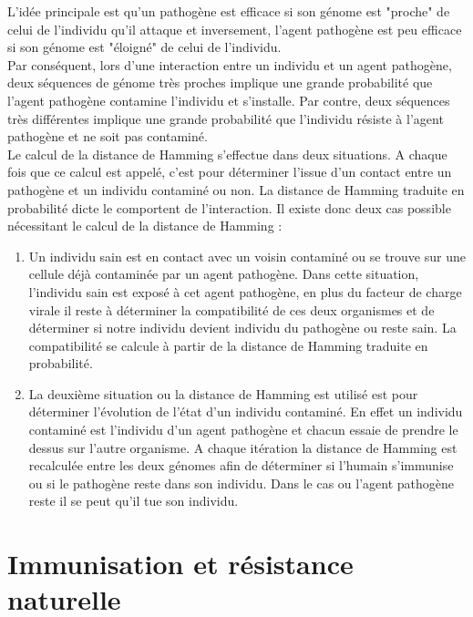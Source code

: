 L'idée principale est qu'un pathogène est efficace si son génome est "proche" de celui de l'individu qu'il attaque et inversement, l'agent pathogène est peu efficace si son génome est "éloigné" de celui de l'individu.\\

Par conséquent, lors d'une interaction entre un individu et un agent pathogène, deux séquences de génome très proches implique une grande probabilité que l'agent pathogène contamine l'individu et s'installe. Par contre, deux séquences très différentes implique une grande probabilité que l'individu résiste à l'agent pathogène et ne soit pas contaminé.\\

Le calcul de la distance de Hamming s'effectue dans deux situations. A chaque fois que ce calcul est appelé, c'est pour déterminer l'issue d'un contact entre un pathogène et un individu contaminé ou non. La distance de Hamming traduite en probabilité dicte le comportent de l’interaction. Il existe donc deux cas possible nécessitant le calcul de la distance de Hamming :

\begin{enumerate}
	\item Un individu sain est en contact avec un voisin contaminé ou se trouve sur une cellule déjà contaminée par un agent pathogène. Dans cette situation, l'individu sain est exposé à cet agent pathogène, en plus du facteur de charge virale il reste à déterminer la compatibilité de ces deux organismes et de déterminer si notre individu devient individu du pathogène ou reste sain. La compatibilité se calcule à partir de la distance de Hamming traduite en probabilité.
	\item La deuxième situation ou la distance de Hamming est utilisé est pour déterminer l'évolution de l'état d'un individu contaminé. En effet un individu contaminé est l'individu d'un agent pathogène et chacun essaie de prendre le dessus sur l'autre organisme. A chaque itération la distance de Hamming est recalculée entre les deux génomes afin de déterminer si l'humain s'immunise ou si le pathogène reste dans son individu. Dans le cas ou l'agent pathogène reste il se peut qu'il tue son individu.
\end{enumerate}

\section{Immunisation et résistance naturelle}

